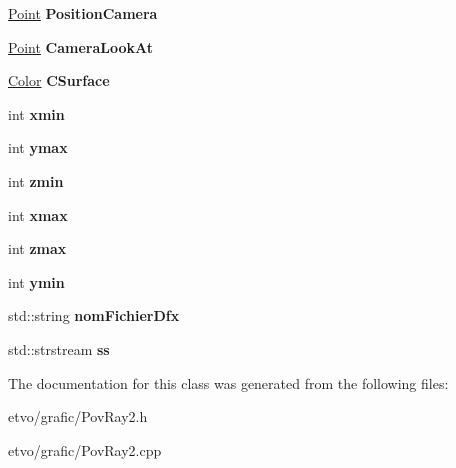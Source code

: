 \begin{DoxyCompactItemize}
\item 
\mbox{\label{class_pov_ray_1_1_pov_ray2_abba09dc6793e4ac70e75b30f5b9b5082}} 
\mbox{\hyperlink{class_pov_ray_1_1_pov_ray2_1_1_point}{Point}} {\bfseries Position\+Camera}
\item 
\mbox{\label{class_pov_ray_1_1_pov_ray2_a219dab2e4a54b7ff61727246837458fa}} 
\mbox{\hyperlink{class_pov_ray_1_1_pov_ray2_1_1_point}{Point}} {\bfseries Camera\+Look\+At}
\item 
\mbox{\label{class_pov_ray_1_1_pov_ray2_ab8c81f8038e987667f05ebfea64d29b9}} 
\mbox{\hyperlink{class_pov_ray_1_1_pov_ray2_1_1_color}{Color}} {\bfseries C\+Surface}
\item 
\mbox{\label{class_pov_ray_1_1_pov_ray2_aac21b14144097da2b288dd35ffca5885}} 
int {\bfseries xmin}
\item 
\mbox{\label{class_pov_ray_1_1_pov_ray2_a2a7b42fbe8d38ecc0b4071205e0c5e20}} 
int {\bfseries ymax}
\item 
\mbox{\label{class_pov_ray_1_1_pov_ray2_aa5ad3e488bc8153cc45ba918409dbf96}} 
int {\bfseries zmin}
\item 
\mbox{\label{class_pov_ray_1_1_pov_ray2_a342e45e1769ece5a245fd647c77060ce}} 
int {\bfseries xmax}
\item 
\mbox{\label{class_pov_ray_1_1_pov_ray2_a715ef2f3a63a842780f08c3bafe275dc}} 
int {\bfseries zmax}
\item 
\mbox{\label{class_pov_ray_1_1_pov_ray2_a5132ba86a9dccd58f6965a19b2491ffc}} 
int {\bfseries ymin}
\item 
\mbox{\label{class_pov_ray_1_1_pov_ray2_a9a1db6d7b3ac0907ce91a73958458d4f}} 
std\+::string {\bfseries nom\+Fichier\+Dfx}
\item 
\mbox{\label{class_pov_ray_1_1_pov_ray2_a262172e2cbfcaeff82b88d054673e9d6}} 
std\+::strstream {\bfseries ss}
\end{DoxyCompactItemize}


The documentation for this class was generated from the following files\+:\begin{DoxyCompactItemize}
\item 
etvo/grafic/Pov\+Ray2.\+h\item 
etvo/grafic/Pov\+Ray2.\+cpp\end{DoxyCompactItemize}
